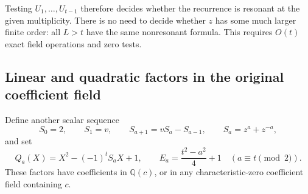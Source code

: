 \documentclass[11pt,a4paper]{article}
\numberwithin{equation}{section}
\theoremstyle{definition}
\theoremstyle{remark}
\newcommand{\QQ}{\mathbb Q}
\begin{document}
Testing $U_1,\ldots,U_{t-1}$ therefore decides whether the recurrence
is resonant at the given multiplicity.  There is no need to decide
whether $z$ has some much larger finite order: all $L>t$ have the same
nonresonant formula.  This requires $O(t)$ exact field operations and
zero tests.

\subsection{Linear and quadratic factors in the original coefficient field}
Define another scalar sequence
\begin{equation}\label{cyc:eq:Srec}
 S_0=2,\qquad S_1=v,\qquad S_{a+1}=vS_a-S_{a-1},
 \qquad S_a=z^a+z^{-a},
\end{equation}
and set
\begin{equation}\label{cyc:eq:Qfactor}
 Q_a(X)=X^2-(-1)^tS_aX+1,\qquad
 E_a=\frac{t^2-a^2}{4}+1\quad(a\equiv t\pmod2).
\end{equation}
These factors have coefficients in $\QQ(c)$, or in any characteristic-zero
coefficient field containing $c$.
\end{document}

